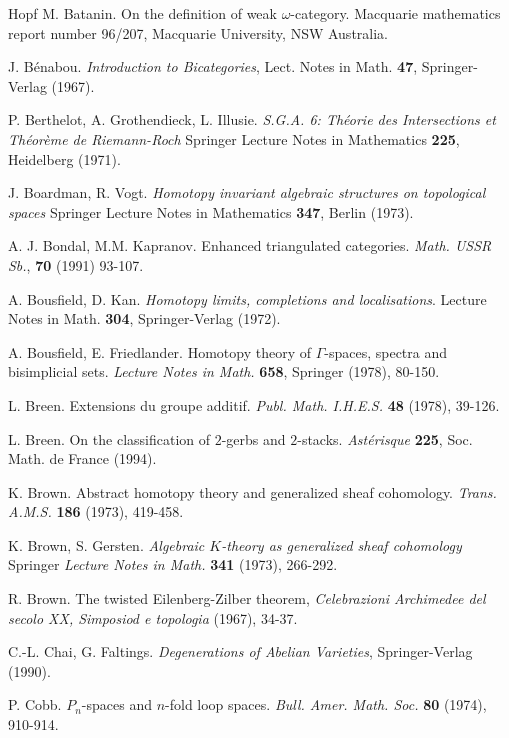 \documentclass[12pt]{article}
\begin{document}
\begin{thebibliography}{Hopf}
M. Batanin. On the definition of weak $\omega$-category. Macquarie mathematics
report number 96/207, Macquarie University, NSW Australia.

J. B\'enabou. {\em Introduction to Bicategories}, Lect. Notes in Math. {\bf
47}, Springer-Verlag (1967).

P. Berthelot, A. Grothendieck, L. Illusie. {\em S.G.A. 6:
Th\'eorie des Intersections et Th\'eor\`eme de Riemann-Roch} Springer Lecture
Notes in Mathematics {\bf 225}, Heidelberg (1971).

J. Boardman, R. Vogt. {\em Homotopy invariant algebraic structures
on topological spaces} Springer Lecture Notes in Mathematics {\bf 347}, Berlin
(1973).

A. J. Bondal, M.M. Kapranov. Enhanced triangulated categories.
{\em Math. USSR Sb.},
{\bf 70} (1991) 93-107.

A. Bousfield, D. Kan. {\em Homotopy limits, completions and localisations}.
Lecture Notes in Math. {\bf 304}, Springer-Verlag (1972).

A. Bousfield, E. Friedlander. Homotopy theory of $\Gamma$-spaces, spectra and
bisimplicial sets. {\em Lecture Notes in Math.} {\bf 658}, Springer (1978),
80-150.

L. Breen. Extensions du groupe additif. {\em Publ. Math. I.H.E.S.} {\bf 48}
(1978), 39-126.

L. Breen. On the classification of $2$-gerbs and $2$-stacks. {\em Ast\'erisque}
{\bf 225}, Soc. Math. de France (1994).

K. Brown. Abstract homotopy theory and generalized sheaf cohomology. {\em
Trans. A.M.S.} {\bf 186} (1973), 419-458.

K. Brown, S. Gersten. {\em Algebraic $K$-theory as generalized sheaf cohomology}
Springer {\em Lecture Notes in Math.} {\bf 341} (1973), 266-292.

R. Brown. The twisted Eilenberg-Zilber theorem, {\em Celebrazioni Archimedee del
secolo XX, Simposiod e topologia} (1967), 34-37.

C.-L. Chai, G. Faltings. {\em Degenerations of Abelian Varieties},
Springer-Verlag (1990).

P. Cobb. $P_n$-spaces and $n$-fold loop spaces. {\em Bull. Amer. Math. Soc.}
{\bf 80} (1974), 910-914.


\end{thebibliography}
\end{document}
